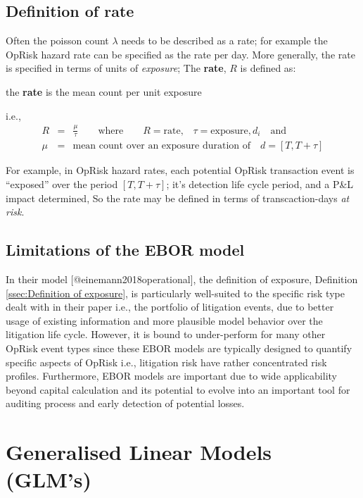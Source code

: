 \documentclass[]{article}
\begin{document}
\subsection{Definition of rate}
\label{ssec:Definition of rate}

Often the poisson count \(\lambda\) needs to be described as a rate; for
example the OpRisk hazard rate can be specified as the rate per day.
More generally, the rate is specified in terms of units of
\emph{exposure}; The \textbf{rate}, \(R\) is defined as:\medskip

\begin{definition}
the \textbf{rate} is the mean count per unit exposure
\end{definition}

i.e., \singlespacing \begin{eqnarray}
R &=& \frac{\mu}{\tau} \qquad \mbox{where} \qquad R = \mbox{rate,} \quad \tau = \mbox{exposure},d_{i}\quad \mbox{and}\nonumber\\
\mu &=& \mbox{mean count over an exposure duration of} \quad d = [T,T+\tau] \nonumber
\end{eqnarray} \doublespacing

For example, in OpRisk hazard rates, each potential OpRisk transaction
event is ``exposed'' over the period \([T,T+\tau]\); it's detection life
cycle period, and a P\&L impact determined, So the rate may be defined
in terms of transcaction-days \emph{at risk}.

\subsection{Limitations of the EBOR model}

In their model {[}@einemann2018operational{]}, the definition of
exposure, Definition \ref{ssec:Definition of exposure}, is particularly
well-suited to the specific risk type dealt with in their paper i.e.,
the portfolio of litigation events, due to better usage of existing
information and more plausible model behavior over the litigation life
cycle. However, it is bound to under-perform for many other OpRisk event
types since these EBOR models are typically designed to quantify
specific aspects of OpRisk i.e., litigation risk have rather
concentrated risk profiles. Furthermore, EBOR models are important due
to wide applicability beyond capital calculation and its potential to
evolve into an important tool for auditing process and early detection
of potential losses.

\section{Generalised Linear Models (GLM's)}
\label{sec:Generalised Linear Models}
\end{document}
